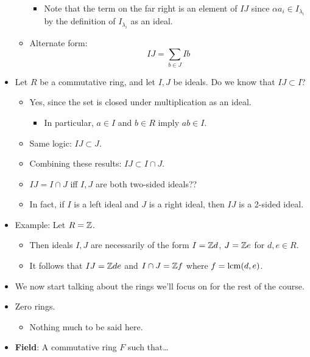\documentclass[../notes.tex]{subfiles}
\begin{document}
\begin{itemize}
\begin{itemize}
\begin{itemize}
            \item Note that the term on the far right is an element of $IJ$ since $\alpha a_i\in I_{\lambda_i}$ by the definition of $I_{\lambda_i}$ as an ideal.
        \end{itemize}
        \item Alternate form:
        \begin{equation*}
            IJ = \sum_{b\in J}Ib
        \end{equation*}
    \end{itemize}
    \item Let $R$ be a commutative ring, and let $I,J$ be ideals. Do we know that $IJ\subset I$?
    \begin{itemize}
        \item Yes, since the set is closed under multiplication as an ideal.
        \begin{itemize}
            \item In particular, $a\in I$ and $b\in R$ imply $ab\in I$.
        \end{itemize}
        \item Same logic: $IJ\subset J$.
        \item Combining these results: $IJ\subset I\cap J$.
        \item $IJ=I\cap J$ iff $I,J$ are both two-sided ideals??
        \item In fact, if $I$ is a left ideal and $J$ is a right ideal, then $IJ$ is a 2-sided ideal.
    \end{itemize}
    \item Example: Let $R=\mathbb{Z}$.
    \begin{itemize}
        \item Then ideals $I,J$ are necessarily of the form $I=\mathbb{Z} d$, $J=\mathbb{Z} e$ for $d,e\in R$.
        \item It follows that $IJ=\mathbb{Z} de$ and $I\cap J=\mathbb{Z} f$ where $f=\operatorname{lcm}(d,e)$.
    \end{itemize}
    \item We now start talking about the rings we'll focus on for the rest of the course.
    \item Zero rings.
    \begin{itemize}
        \item Nothing much to be said here.
    \end{itemize}
    \item \textbf{Field}: A commutative ring $F$ such that\dots
    \begin{enumerate}[label={(\roman*)}]

\end{enumerate}
\end{itemize}
\end{document}
